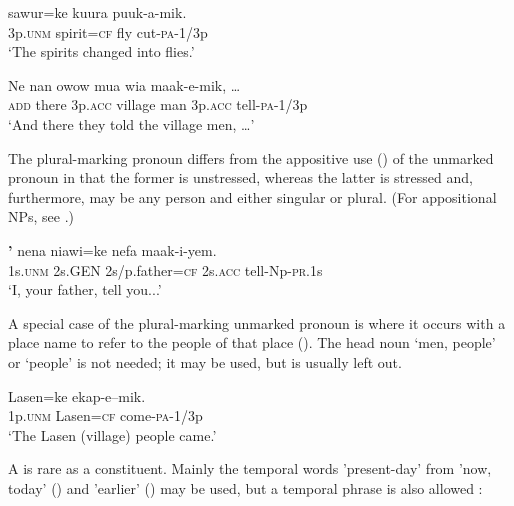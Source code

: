 \ea%
\label{ex:x398}
\gll {}  sawur=ke  kuura  puuk-a-mik. \\
   3p.\textsc{unm}  spirit=\textsc{cf}  fly  cut-\textsc{pa}-1/3p   \\
\glt`The spirits changed into flies.'
\z





\ea%
\label{ex:x1831}
\gll Ne  nan    owow  mua  wia  maak-e-mik,  {\dots} \\
  \textsc{add}  there  3p.\textsc{acc}  village  man  3p.\textsc{acc}  tell-\textsc{pa}-1/3p    \\
\glt`And there they told the village men, {\dots}'
\z





The plural-marking pronoun differs from the appositive use () of the unmarked pronoun in that the former is unstressed, whereas the latter is stressed and, furthermore, may be any person and either singular or plural. (For appositional NPs, see .)

\ea%
\label{ex:x399}
\gll \textbf{'}  nena  niawi=ke  nefa  maak-i-yem. \\
    1s.\textsc{unm}  2s.GEN  2s/p.father=\textsc{cf}  2s.\textsc{acc}  tell-Np-\textsc{pr}.1s  \\
\glt`I, your father, tell you...'
\z





A special case of the plural-marking unmarked pronoun is where it occurs with a place name to refer to the people of that place ().  The head noun  `men, people' or   `people' is not needed; it may be used, but is usually left out.

\ea%
\label{ex:x400}
\gll {}  Lasen=ke  ekap-e--mik. \\
  1p.\textsc{unm}  Lasen=\textsc{cf}  come-\textsc{pa}-1/3p    \\
\glt`The Lasen (village) people came.'
\z





A  is rare as a  constituent. Mainly the temporal words   'present-day' from  'now, today' () and  'earlier' () may be used, but a temporal phrase is also allowed : 

